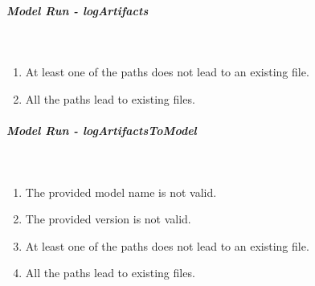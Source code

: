 \subparagraph{Model Run - logArtifacts} \mbox{}\\

\begin{enumerate}
    \item At least one of the paths does not lead to an existing file.
    \item All the paths lead to existing files.
\end{enumerate}

\subparagraph{Model Run - logArtifactsToModel} \mbox{}\\

\begin{enumerate}
    \item The provided model name is not valid.
    \item The provided version is not valid.
    \item At least one of the paths does not lead to an existing file.
    \item All the paths lead to existing files.
\end{enumerate}
